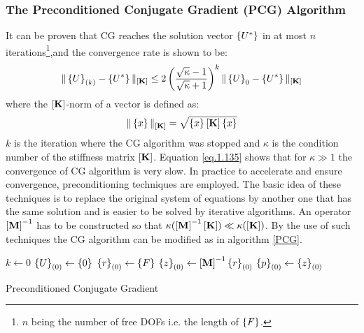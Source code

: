 \subsubsection{The Preconditioned Conjugate Gradient (PCG) Algorithm}
It can be proven \cite{saad2003iterative} that CG reaches the solution vector $\left\lbrace{U^*}\right \rbrace$ in at most $n$ iterations\footnote{$n$ being the number of free DOFs i.e. the length of $\left\lbrace{F}\right \rbrace$.},and the convergence rate is shown to be:
\begin{equation}
\label{eq.1.135}
\|\left\lbrace{U}\right \rbrace_{(k)}-\left\lbrace{U^*}\right \rbrace\|_{\left[{\mathbf{K}}\right]}\leq 2 \left(\frac{\sqrt{\kappa}-1}{\sqrt{\kappa}+1}\right)^k\|\left\lbrace{U}\right \rbrace_{0}-\left\lbrace{U^*}\right \rbrace\|_{\left[{\mathbf{K}}\right]}
\end{equation}
where the $\left[{\mathbf{K}}\right]$-norm of a vector is defined as:
\begin{equation}
\|\left\lbrace{x}\right \rbrace\|_{\left[{\mathbf{K}}\right]}=\sqrt{\left\lbrace{x}\right \rbrace\left[{\mathbf{K}}\right]\left\lbrace{x}\right \rbrace}
\end{equation}
$k$ is the iteration where the CG algorithm was stopped and $\kappa$ is the condition number of the stiffness matrix $\left[{\mathbf{K}}\right]$. Equation \eqref{eq.1.135} shows that for $\kappa\gg 1$ the convergence of CG algorithm is very slow. In practice to accelerate and ensure convergence, preconditioning techniques are employed. The basic idea of these techniques is to replace the original system of equations by another one that has the same solution and is easier to be solved by iterative algorithms. An operator $\left[{\mathbf{M}}\right]^{-1}$ has to be constructed so that $\kappa(\left[{\mathbf{M}}\right]^{-1}\left[{\mathbf{K}}\right]) \ll \kappa( \left[{\mathbf{K}}\right])$.
By the use of such techniques the CG algorithm can be modified as in algorithm \ref{PCG}.
\begin{algorithm}[ht!]

$k\gets 0$\;
$\left\lbrace{U}\right \rbrace_{(0)}\gets\left\lbrace{0}\right \rbrace$\;
$\left\lbrace{r}\right \rbrace_{(0)}\gets \left\lbrace{F}\right \rbrace$\;
$\left\lbrace{z}\right \rbrace_{(0)}\gets \left[{\mathbf{M}}\right]^{-1} \left\lbrace{r}\right \rbrace_{(0)}$\;
$\left\lbrace{p}\right \rbrace_{(0)}\gets \left\lbrace{z}\right \rbrace_{(0)}$\;
 \caption{Preconditioned Conjugate Gradient \label{PCG}}
\end{algorithm}

